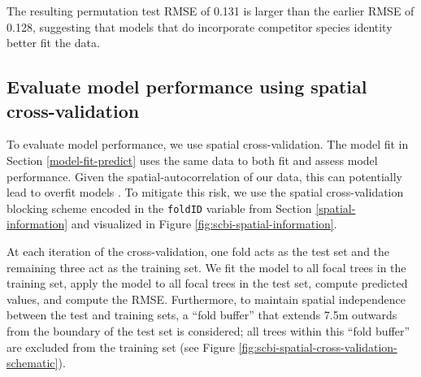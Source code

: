 \documentclass[12pt]{article}
\newenvironment{Shaded}{\begin{snugshade}}{\end{snugshade}}
\newcommand{\CommentTok}[1]{\textcolor[rgb]{0.56,0.35,0.01}{\textit{#1}}}
\newcommand{\DataTypeTok}[1]{\textcolor[rgb]{0.13,0.29,0.53}{#1}}
\newcommand{\KeywordTok}[1]{\textcolor[rgb]{0.13,0.29,0.53}{\textbf{#1}}}
\newcommand{\NormalTok}[1]{#1}
\newcommand{\OperatorTok}[1]{\textcolor[rgb]{0.81,0.36,0.00}{\textbf{#1}}}
\newcommand{\StringTok}[1]{\textcolor[rgb]{0.31,0.60,0.02}{#1}}
\begin{document}
\begin{Shaded}
\end{Shaded}

The resulting permutation test RMSE of 0.131 is larger than the earlier
RMSE of 0.128, suggesting that models that do incorporate competitor
species identity better fit the data.

\hypertarget{spatial-cross-validation}{%
\subsection{Evaluate model performance using spatial
cross-validation}\label{spatial-cross-validation}}

To evaluate model performance, we use spatial cross-validation. The
model fit in Section \ref{model-fit-predict} uses the same data to both
fit and assess model performance. Given the spatial-autocorrelation of
our data, this can potentially lead to overfit models
\citep{roberts_cross-validation_2017}. To mitigate this risk, we use the
spatial cross-validation blocking scheme encoded in the \texttt{foldID}
variable from Section \ref{spatial-information} and visualized in Figure
\ref{fig:scbi-spatial-information}.

At each iteration of the cross-validation, one fold acts as the test set
and the remaining three act as the training set. We fit the model to all
focal trees in the training set, apply the model to all focal trees in
the test set, compute predicted values, and compute the RMSE.
Furthermore, to maintain spatial independence between the test and
training sets, a ``fold buffer'' that extends 7.5m outwards from the
boundary of the test set is considered; all trees within this ``fold
buffer'' are excluded from the training set (see Figure
\ref{fig:scbi-spatial-cross-validation-schematic}).
\end{document}
